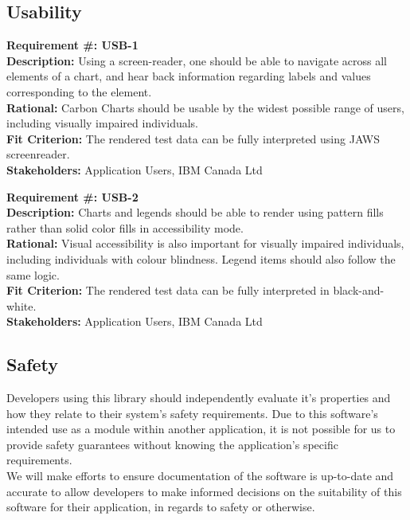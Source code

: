\documentclass[12pt, titlepage]{article}
\begin{document}
\subsection{Usability}
\begin{flushleft}
\textbf{Requirement \#: USB-1} \\
\textbf{Description:} Using a screen-reader, one should be able to navigate across all elements of a chart, and hear back information regarding labels and values corresponding to the element. \\
\textbf{Rational:} Carbon Charts should be usable by the widest possible range of users, including visually impaired individuals. \\
\textbf{Fit Criterion:} The rendered test data can be fully interpreted using JAWS screenreader. \\
\textbf{Stakeholders:} Application Users, IBM Canada Ltd \\
\end{flushleft}
\begin{flushleft}
\textbf{Requirement \#: USB-2} \\
\textbf{Description:} Charts and legends should be able to render using pattern fills rather than solid color fills in accessibility mode. \\
\textbf{Rational:} Visual accessibility is also important for visually impaired individuals, including individuals with colour blindness. Legend items should also follow the same logic. \\
\textbf{Fit Criterion:} The rendered test data can be fully interpreted in black-and-white. \\
\textbf{Stakeholders:} Application Users, IBM Canada Ltd \\
\end{flushleft}
\subsection{Safety}
Developers using this library should independently evaluate it's properties and how they relate to their system's safety requirements. Due to this software's intended use as a module within another application, it is not possible for us to provide safety guarantees without knowing the application's specific requirements. \\

We will make efforts to ensure documentation of the software is up-to-date and accurate to allow developers to make informed decisions on the suitability of this software for their application, in regards to safety or otherwise.
\end{document}
